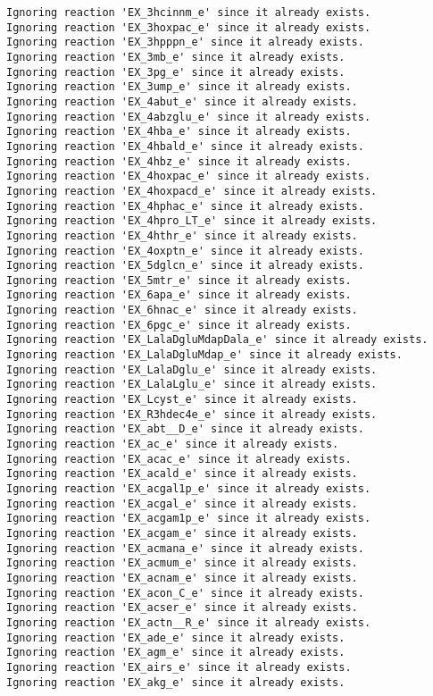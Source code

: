 \documentclass[
  letterpaper,
  DIV=11,
  numbers=noendperiod]{scrartcl}
\begin{document}
\begin{verbatim}
Ignoring reaction 'EX_3hcinnm_e' since it already exists.
Ignoring reaction 'EX_3hoxpac_e' since it already exists.
Ignoring reaction 'EX_3hpppn_e' since it already exists.
Ignoring reaction 'EX_3mb_e' since it already exists.
Ignoring reaction 'EX_3pg_e' since it already exists.
Ignoring reaction 'EX_3ump_e' since it already exists.
Ignoring reaction 'EX_4abut_e' since it already exists.
Ignoring reaction 'EX_4abzglu_e' since it already exists.
Ignoring reaction 'EX_4hba_e' since it already exists.
Ignoring reaction 'EX_4hbald_e' since it already exists.
Ignoring reaction 'EX_4hbz_e' since it already exists.
Ignoring reaction 'EX_4hoxpac_e' since it already exists.
Ignoring reaction 'EX_4hoxpacd_e' since it already exists.
Ignoring reaction 'EX_4hphac_e' since it already exists.
Ignoring reaction 'EX_4hpro_LT_e' since it already exists.
Ignoring reaction 'EX_4hthr_e' since it already exists.
Ignoring reaction 'EX_4oxptn_e' since it already exists.
Ignoring reaction 'EX_5dglcn_e' since it already exists.
Ignoring reaction 'EX_5mtr_e' since it already exists.
Ignoring reaction 'EX_6apa_e' since it already exists.
Ignoring reaction 'EX_6hnac_e' since it already exists.
Ignoring reaction 'EX_6pgc_e' since it already exists.
Ignoring reaction 'EX_LalaDgluMdapDala_e' since it already exists.
Ignoring reaction 'EX_LalaDgluMdap_e' since it already exists.
Ignoring reaction 'EX_LalaDglu_e' since it already exists.
Ignoring reaction 'EX_LalaLglu_e' since it already exists.
Ignoring reaction 'EX_Lcyst_e' since it already exists.
Ignoring reaction 'EX_R3hdec4e_e' since it already exists.
Ignoring reaction 'EX_abt__D_e' since it already exists.
Ignoring reaction 'EX_ac_e' since it already exists.
Ignoring reaction 'EX_acac_e' since it already exists.
Ignoring reaction 'EX_acald_e' since it already exists.
Ignoring reaction 'EX_acgal1p_e' since it already exists.
Ignoring reaction 'EX_acgal_e' since it already exists.
Ignoring reaction 'EX_acgam1p_e' since it already exists.
Ignoring reaction 'EX_acgam_e' since it already exists.
Ignoring reaction 'EX_acmana_e' since it already exists.
Ignoring reaction 'EX_acmum_e' since it already exists.
Ignoring reaction 'EX_acnam_e' since it already exists.
Ignoring reaction 'EX_acon_C_e' since it already exists.
Ignoring reaction 'EX_acser_e' since it already exists.
Ignoring reaction 'EX_actn__R_e' since it already exists.
Ignoring reaction 'EX_ade_e' since it already exists.
Ignoring reaction 'EX_agm_e' since it already exists.
Ignoring reaction 'EX_airs_e' since it already exists.
Ignoring reaction 'EX_akg_e' since it already exists.

\end{verbatim}
\end{document}
